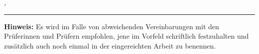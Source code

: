%
%
%

\bigskip

\noindent\textit{\thesisUniversityCity, \thesisDate}

\smallskip

\begin{flushright}
	\begin{minipage}{5cm}
		\rule{\textwidth}{1pt}
		\centering\thesisName
	\end{minipage}
\end{flushright}

\textbf{Hinweis:} Es wird im Falle von abweichenden Vereinbarungen mit den Prüferinnen und Prüfern empfohlen, jene im Vorfeld schriftlich festzuhalten und zusätzlich auch noch einmal in der eingereichten Arbeit zu benennen.


